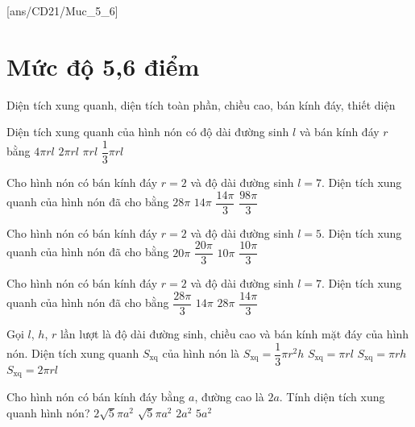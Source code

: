 [ans/CD21/Muc_5_6]
\setcounter{ex}{0}
\setcounter{dang}{0}
\section{Mức độ 5,6 điểm}
\begin{dang}
	{Diện tích xung quanh, diện tích toàn phần, chiều cao, bán kính đáy, thiết diện}
\end{dang}
\begin{ex}
	Diện tích xung quanh của hình nón có độ dài đường sinh $l$ và bán kính đáy $r$ bằng
	\choice
	{$4\pi rl$}      
	{$2\pi rl$}
	{\True $\pi rl$}
	{$\dfrac{1}{3}\pi rl$}
\end{ex}
\begin{ex}
	[Mã 102 - 2020 Lần 2]%
	Cho hình nón có bán kính đáy $r=2$ và độ dài đường sinh $l=7$. Diện tích xung quanh của hình nón đã cho bằng
	\choice
	{$28\pi$}
	{\True $14\pi$}
	{$\dfrac{14\pi}{3}$}
	{$\dfrac{98\pi}{3}$}
\end{ex}
\begin{ex}
	[Mã 101 - 2020 Lần 2]%
	Cho hình nón có bán kính đáy $r=2$ và độ dài đường sinh $l=5$. Diện tích xung quanh của hình nón đã cho bằng
	\choice
	{$20\pi$}
	{$\dfrac{20\pi}{3}$}
	{\True $10\pi$}
	{$\dfrac{10\pi}{3}$}
\end{ex}
\begin{ex}
	[Mã 104 - 2020 Lần 2]%
	Cho hình nón có bán kính đáy $r=2$ và độ dài đường sinh $l=7$. Diện tích xung quanh của hình nón đã cho bằng
	\choice
	{$\dfrac{28\pi}{3}$}
	{\True $14\pi$}
	{$28\pi$}
	{$\dfrac{14\pi}{3}$}
\end{ex}
\begin{ex}
	Gọi $l$, $h$, $r$ lần lượt là độ dài đường sinh, chiều cao và bán kính mặt đáy của hình nón. Diện tích xung quanh $S_{\mathrm{xq}}$ của hình nón là 
	\choice
	{$S_{\mathrm{xq}}=\dfrac{1}{3}\pi r^2h$}
	{\True $S_{\mathrm{xq}}=\pi rl$}
	{$S_{\mathrm{xq}}=\pi rh$}
	{$S_{\mathrm{xq}}=2\pi rl$}
\end{ex}
\begin{ex}
	Cho hình nón có bán kính đáy bằng $a$, đường cao là $2a$. Tính diện tích xung quanh hình nón?
	\choice
	{$2\sqrt{5}\pi a^2$}
	{\True $\sqrt{5}\pi a^2$}
	{$2a^2$}
	{$5a^2$}
\end{ex}
